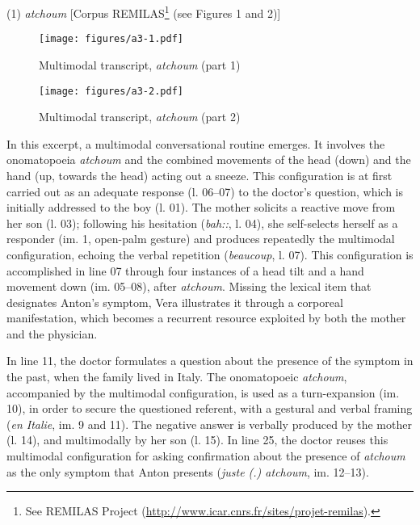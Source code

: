 \documentclass[output=paper]{langscibook}
\begin{document}
\ea\label{ex:12:1} (1) \textit{atchoum} [Corpus REMILAS\footnote{See REMILAS Project
(\url{http://www.icar.cnrs.fr/sites/projet-remilas}).} (see Figures 1 and 2)]\z

\begin{figure}[p]
\caption{Multimodal transcript, \textit{atchoum} (part 1)\label{fig:12:1}}
\texttt{[image: figures/a3-1.pdf]}
\end{figure}

\begin{figure}[p]
\caption{Multimodal transcript, \textit{atchoum} (part 2)\label{fig:12:2}}
\texttt{[image: figures/a3-2.pdf]}
\end{figure}

In this excerpt, a multimodal conversational routine emerges. It involves the onomatopoeia \textit{atchoum} and the combined movements of the head (down) and the hand (up, towards the head) acting out a sneeze. This configuration is at first carried out as an adequate response (l. 06--07) to the doctor's question, which is initially addressed to the boy (l. 01). The mother solicits a reactive move from her son (l. 03); following his hesitation (\textit{bah::}, l. 04), she self-selects herself as a responder (im. 1, open-palm gesture) and produces repeatedly the multimodal configuration, echoing the verbal repetition (\textit{beaucoup}, l. 07). This configuration is accomplished in line 07 through four instances of a head tilt and a hand movement down (im. 05--08), after \textit{atchoum}. Missing the lexical item that designates Anton's symptom, Vera illustrates it through a corporeal manifestation, which becomes a recurrent resource exploited by both the mother and the physician.

In line 11, the doctor formulates a question about the presence of the symptom in the past, when the family lived in Italy. The onomatopoeic \textit{atchoum}, accompanied by the multimodal configuration, is used as a turn-expansion (im. 10), in order to secure the questioned referent, with a gestural and verbal framing (\textit{en Italie}, im. 9 and 11). The negative answer is verbally produced by the mother (l. 14), and multimodally by her son (l. 15). In line 25, the doctor reuses this multimodal configuration for asking confirmation about the presence of \textit{atchoum} as the only symptom that Anton presents (\textit{juste (.) atchoum}, im. 12--13).
\end{document}

